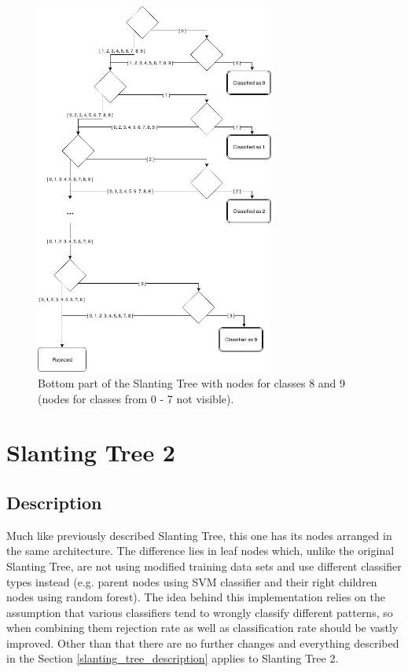 \begin{figure}[!t]
	\centering
	\includegraphics[width=0.7\textwidth]{Figures/slanting_tree_structure.jpg}
	\caption{Bottom part of the Slanting Tree with nodes for classes 8 and 9 (nodes for classes from 0 - 7 not visible).}
	\label{fig:rejection_version2}\vspace{-3pt}
\end{figure}

\section{Slanting Tree 2}

\subsection{Description}

Much like previously described Slanting Tree, this one has its nodes arranged in the same architecture. The difference lies in leaf nodes which, unlike the original Slanting Tree, are not using modified training data sets and use different classifier types instead (e.g. parent nodes using SVM classifier and their right children nodes using random forest). The idea behind this implementation relies on the assumption that various classifiers tend to wrongly classify different patterns, so when combining them rejection rate as well as classification rate should be vastly improved. Other than that there are no further changes and everything described in the Section \ref{slanting_tree_description} applies to Slanting Tree 2.

